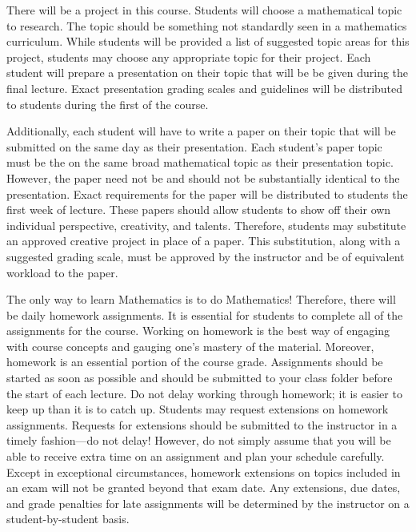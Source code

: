 \documentclass[11pt,letterpaper]{article}
\begin{document}
There will be a project in this course. Students will choose a mathematical topic to research. The topic should be something not standardly seen in a mathematics curriculum. While students will be provided a list of suggested topic areas for this project, students may choose any appropriate topic for their project. Each student will prepare a presentation on their topic that will be be given during the final lecture. Exact presentation grading scales and guidelines will be distributed to students during the first of the course. \pspace

Additionally, each student will have to write a paper on their topic that will be submitted on the same day as their presentation. Each student's paper topic must be the on the same broad mathematical topic as their presentation topic. However, the paper need not be and should not be substantially identical to the presentation. Exact requirements for the paper will be distributed to students the first week of lecture. These papers should allow students to show off their own individual perspective, creativity, and talents. Therefore, students may substitute an approved creative project in place of a paper. This substitution, along with a suggested grading scale, must be approved by the instructor and be of equivalent workload to the paper. 
\sectionbreak
 


The only way to learn Mathematics is to do Mathematics! Therefore, there will be daily homework assignments. It is essential for students to complete all of the assignments for the course. Working on homework is the best way of engaging with course concepts and gauging one's mastery of the material. Moreover, homework is an essential portion of the course grade. Assignments should be started as soon as possible and should be submitted to your class folder before the start of each lecture. Do not delay working through homework; it is easier to keep up than it is to catch up. Students may request extensions on homework assignments. Requests for extensions should be submitted to the instructor in a timely fashion---do not delay! However, do not simply assume that you will be able to receive extra time on an assignment and plan your schedule carefully. Except in exceptional circumstances, homework extensions on topics included in an exam will not be granted beyond that exam date. Any extensions, due dates, and grade penalties for late assignments will be determined by the instructor on a student-by-student basis. \pspace
\end{document}
